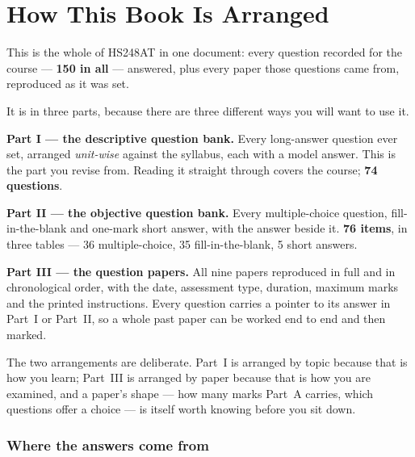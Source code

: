 \chapter*{How This Book Is Arranged}
\thispagestyle{plain}

This is the whole of HS248AT in one document: every question recorded for the
course --- \textbf{150 in all} --- answered, plus every paper those questions
came from, reproduced as it was set.

\vspace{2pt}
It is in three parts, because there are three different ways you will want to
use it.

\begin{abul}
\item \textbf{Part I --- the descriptive question bank.} Every long-answer
      question ever set, arranged \emph{unit-wise} against the syllabus, each
      with a model answer. This is the part you revise from. Reading it
      straight through covers the course; \textbf{74 questions}.
\item \textbf{Part II --- the objective question bank.} Every multiple-choice
      question, fill-in-the-blank and one-mark short answer, with the answer
      beside it. \textbf{76 items}, in three tables --- 36 multiple-choice,
      35 fill-in-the-blank, 5 short answers.
\item \textbf{Part III --- the question papers.} All nine papers reproduced in
      full and in chronological order, with the date, assessment type,
      duration, maximum marks and the printed instructions. Every question
      carries a pointer to its answer in Part~I or Part~II, so a whole past
      paper can be worked end to end and then marked.
\end{abul}

The two arrangements are deliberate. Part~I is arranged by topic because
that is how you learn; Part~III is arranged by paper because that is how you
are examined, and a paper's shape --- how many marks Part~A carries, which
questions offer a choice --- is itself worth knowing before you sit down.

\subsection*{Where the answers come from}

